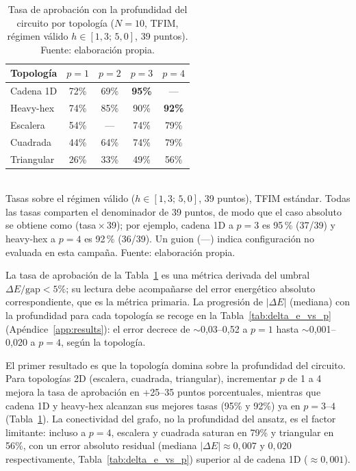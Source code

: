 \documentclass[11pt,a4paper,spanish]{book}
\begin{document}
\begin{table}[H]
\centering
\caption[Tasa de aprobación frente a la profundidad por topología]{Tasa de aprobación con la profundidad del circuito por topología ($N = 10$, TFIM, régimen válido $h \in [1{,}3;\, 5{,}0]$, 39 puntos). Fuente: elaboración propia.}
\label{tab:cross_topo_depth}
\begin{tabular}{lcccc}
\toprule
\textbf{Topología} & \textbf{$p = 1$} & \textbf{$p = 2$} & \textbf{$p = 3$} & \textbf{$p = 4$} \\
\midrule
Cadena 1D & 72\% & 69\% & \textbf{95\%} & --- \\
Heavy-hex & 74\% & 85\% & 90\% & \textbf{92\%} \\
Escalera & 54\% & --- & 74\% & 79\% \\
Cuadrada & 44\% & 64\% & 74\% & 79\% \\
Triangular & 26\% & 33\% & 49\% & 56\% \\
\bottomrule
\end{tabular}
\\[2pt]
\footnotesize Tasas sobre el régimen válido ($h \in [1{,}3;\, 5{,}0]$, 39 puntos), TFIM estándar. Todas las tasas comparten el denominador de 39 puntos, de modo que el caso absoluto se obtiene como (tasa\,$\times$\,39); por ejemplo, cadena 1D a $p = 3$ es 95\,\% (37/39) y heavy-hex a $p = 4$ es 92\,\% (36/39). Un guion (---) indica configuración no evaluada en esta campaña. Fuente: elaboración propia.
\end{table}

La tasa de aprobación de la Tabla~\ref{tab:cross_topo_depth} es una métrica derivada del umbral $\Delta E/\text{gap} < 5\%$; su lectura debe acompañarse del error energético absoluto correspondiente, que es la métrica primaria. La progresión de $|\Delta E|$ (mediana) con la profundidad para cada topología se recoge en la Tabla~\ref{tab:delta_e_vs_p} (Apéndice~\ref{app:results}): el error decrece de $\sim$0,03--0,52 a $p=1$ hasta $\sim$0,001--0,020 a $p=4$, según la topología.

El primer resultado es que la topología domina sobre la profundidad del circuito. Para topologías 2D (escalera, cuadrada, triangular), incrementar $p$ de 1 a 4 mejora la tasa de aprobación en +25--35 puntos porcentuales, mientras que cadena 1D y heavy-hex alcanzan sus mejores tasas (95\% y 92\%) ya en $p = 3$--$4$ (Tabla~\ref{tab:cross_topo_depth}). La conectividad del grafo, no la profundidad del ansatz, es el factor limitante: incluso a $p = 4$, escalera y cuadrada saturan en 79\% y triangular en 56\%, con un error absoluto residual (mediana $|\Delta E| \approx 0,007$ y $0,020$ respectivamente, Tabla~\ref{tab:delta_e_vs_p}) superior al de cadena 1D ($\approx 0,001$).
\end{document}
